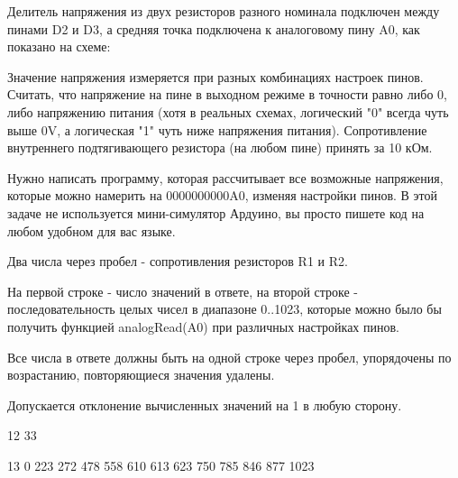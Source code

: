 
Делитель напряжения из двух резисторов разного номинала подключен между пинами D2 и D3, а средняя точка подключена к аналоговому пину A0, как показано на схеме:


Значение напряжения измеряется при разных комбинациях настроек пинов. Считать, что напряжение на пине в выходном режиме в точности равно либо 0, либо напряжению питания (хотя в реальных схемах, логический "0" всегда чуть выше 0V, а логическая "1" чуть ниже напряжения питания). Сопротивление внутреннего подтягивающего резистора (на любом пине) принять за 10 кОм.  

Нужно написать программу, которая рассчитывает все возможные напряжения, которые можно намерить на 0000000000A0, изменяя настройки пинов.  В этой задаче не используется мини-симулятор Ардуино, вы просто пишете код на любом удобном для вас языке.

Два числа через пробел - сопротивления резисторов R1 и R2.

\outputfmtSection
На первой строке - число значений в ответе, на второй строке - последовательность целых чисел в диапазоне 0..1023, 
которые можно было бы получить функцией analogRead(A0) при различных настройках пинов.  

Все числа в ответе должны быть  на одной строке через пробел,  упорядочены по возрастанию,  
повторяющиеся значения удалены. 

Допускается отклонение вычисленных значений на 1 в любую сторону.

\begin{myverbbox}[\small]{\vinput}
    12 33
\end{myverbbox}
\begin{myverbbox}[\small]{\voutput}
    13
    0 223 272 478 558 610 613 623 750 785 846 877 1023
\end{myverbbox}


